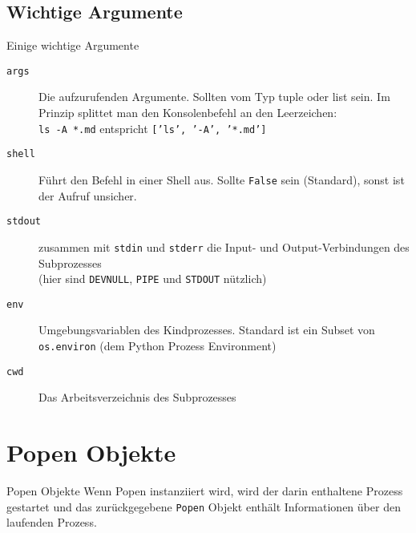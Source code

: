 \subsection{Wichtige Argumente}
\begin{frame}[fragile]{Einige wichtige Argumente}
	\begin{description}
		\item[\texttt{args}] Die aufzurufenden Argumente. Sollten vom Typ
			\alert{tuple} oder \alert{list} sein. Im Prinzip splittet man den
			Konsolenbefehl an den Leerzeichen: \\
			\texttt{ls -A *.md} entspricht \texttt{['ls', '-A', '*.md']}
		\item[\texttt{shell}] F\"uhrt den Befehl in einer Shell aus.
			Sollte \texttt{False} sein (Standard), sonst ist der Aufruf unsicher.
		\item[\texttt{stdout}] zusammen mit \texttt{stdin} und \texttt{stderr} die Input- und
			Output-Verbindungen des Subprozesses \\
			(hier sind \texttt{DEVNULL}, \texttt{PIPE} und \texttt{STDOUT} n\"utzlich)
		\item[\texttt{env}] Umgebungsvariablen des Kindprozesses. Standard ist ein
			Subset von \texttt{os.environ} (dem Python Prozess Environment)
		\item[\texttt{cwd}] Das Arbeitsverzeichnis des Subprozesses
	\end{description}
\end{frame}


\section{Popen Objekte}
\begin{frame}{Popen Objekte}
	Wenn Popen instanziiert wird, wird der darin enthaltene Prozess gestartet und
	das zur\"uckgegebene \texttt{Popen} Objekt enth\"alt Informationen \"uber den
	laufenden Prozess.
\end{frame}

